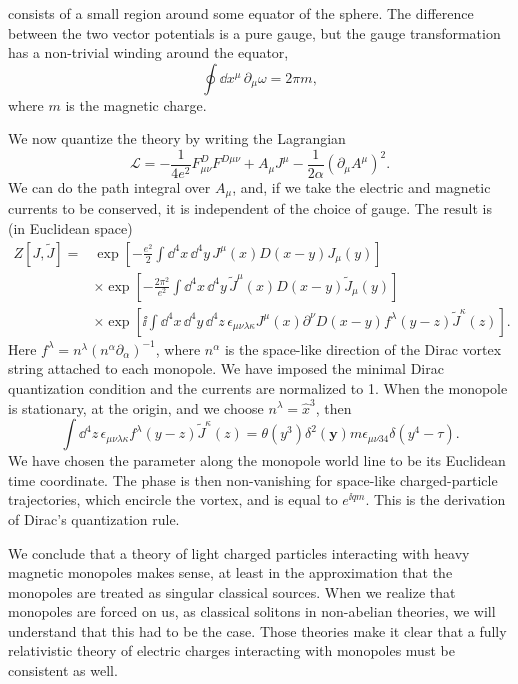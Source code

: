 consists of a small region around some equator of the sphere. The difference
between the two vector potentials is a pure gauge, but the gauge transformation
has a non-trivial winding around the equator,
\begin{equation*}
  \oint\dd x^\mu\,\partial_\mu\omega=2\pi m,
\end{equation*}
where $m$ is the magnetic charge.

We now quantize the theory by writing the Lagrangian
\begin{equation*}
  \mathcal L=-\frac{1}{4e^2}F^D_{\mu\nu}F^{D\mu\nu}
  +A_\mu J^\mu-\frac{1}{2\alpha}(\partial_\mu A^\mu)^2.
\end{equation*}
We can do the path integral over $A_\mu$, and, if we take the electric and
magnetic currents to be conserved, it is independent of the choice of gauge.
The result is (in Euclidean space)
\begin{equation*}
\begin{split}
Z[J,\widetilde J]={}&\exp\!\left[-\frac{e^2}{2}\int\dd^4x\,\dd^4y\,
  J^\mu(x)D(x-y)J_\mu(y)\right]\\
  &\times\exp\!\left[-\frac{2\pi^2}{e^2}\int\dd^4x\,\dd^4y\,
  \widetilde J^\mu(x)D(x-y)\widetilde J_\mu(y)\right]\\
  &\times\exp\!\left[\ii\int\dd^4x\,\dd^4y\,\dd^4z\,
  \epsilon_{\mu\nu\lambda\kappa}J^\mu(x)\partial^\nu D(x-y)
  f^\lambda(y-z)\widetilde J^\kappa(z)\right].
\end{split}
\end{equation*}
Here $f^\lambda=n^\lambda(n^\alpha\partial_\alpha)^{-1}$, where $n^\alpha$ is
the space-like direction of the Dirac vortex string attached to each monopole.
We have imposed the minimal Dirac quantization condition and the currents are
normalized to 1. When the monopole is stationary, at the origin, and we choose
$n^\lambda=\hat x^3$, then
\begin{equation*}
  \int\dd^4z\,\epsilon_{\mu\nu\lambda\kappa}f^\lambda(y-z)
  \widetilde J^\kappa(z)=\theta(y^3)\delta^2(\mathbf y)
  m\epsilon_{\mu\nu34}\delta(y^4-\tau).
\end{equation*}
We have chosen the parameter along the monopole world line to be its Euclidean
time coordinate. The phase is then non-vanishing for space-like charged-particle
trajectories, which encircle the vortex, and is equal to $e^{\ii qm}$. This is
the derivation of Dirac's quantization rule.

We conclude that a theory of light charged particles interacting with heavy
magnetic monopoles makes sense, at least in the approximation that the monopoles
are treated as singular classical sources. When we realize that monopoles are
forced on us, as classical solitons in non-abelian theories, we will understand
that this had to be the case. Those theories make it clear that a fully
relativistic theory of electric charges interacting with monopoles must be
consistent as well.

